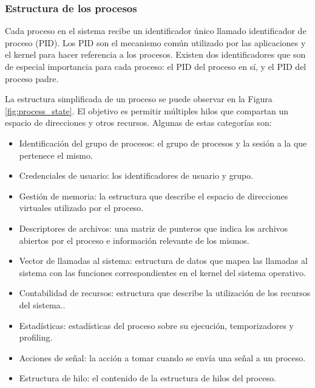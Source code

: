 \subsubsection{Estructura de los procesos}
Cada proceso en el sistema recibe un identificador único llamado identificador de proceso (PID). Los PID son el mecanismo común utilizado por las aplicaciones y el kernel para hacer referencia a los procesos. Existen dos identificadores que son de especial importancia para cada proceso: el PID del proceso en sí, y el PID del proceso padre.\par

La estructura simplificada de un proceso se puede observar en la Figura \ref{fig:process_state}. El objetivo es permitir múltiples hilos que compartan un espacio de direcciones y otros recursos. Algunas de estas categorías son:\par

\begin{itemize}
    \item Identificación del grupo de procesos: el grupo de procesos y la sesión a la que pertenece el mismo.
    \item Credenciales de usuario: los identificadores de usuario y grupo.
    \item Gestión de memoria: la estructura que describe el espacio de direcciones virtuales utilizado por el proceso.
    \item Descriptores de archivos: una matriz de punteros que indica los archivos abiertos por el proceso e información relevante de los mismos.
    \item Vector de llamadas al sistema: estructura de datos que mapea las llamadas al sistema con las funciones correspondientes en el kernel del sistema operativo.
    \item Contabilidad de recursos: estructura que describe la utilización de los recursos del sistema..
    \item Estadísticas: estadísticas del proceso sobre su ejecución, temporizadores y profiling.
    \item Acciones de señal: la acción a tomar cuando se envía una señal a un proceso.
    \item Estructura de hilo: el contenido de la estructura de hilos del proceso.
\end{itemize}

